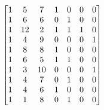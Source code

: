 \documentclass[preview]{standalone}
\begin{document}
\begin{align*}
\special{dvisvgm:raw <g id='unique000'>}\begin{bmatrix}1&5&7&1&0&0&0\\1&6&6&0&1&0&0\\1&12&2&1&1&1&0\\1&4&9&0&0&0&1\\1&8&8&1&0&0&0\\1&6&5&1&1&0&0\\1&3&10&0&0&0&1\\1&4&7&0&1&0&0\\1&4&6&1&0&0&0\\1&1&8&0&1&0&0\end{bmatrix}\special{dvisvgm:raw </g>}
\end{align*}
\end{document}
